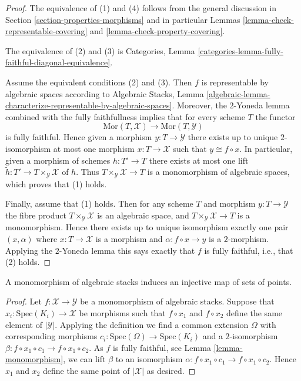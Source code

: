 \begin{proof}
The equivalence of (1) and (4) follows from the general discussion in
Section \ref{section-properties-morphisms}
and in particular
Lemmas \ref{lemma-check-representable-covering} and
\ref{lemma-check-property-covering}.

\medskip\noindent
The equivalence of (2) and (3) is
Categories, Lemma \ref{categories-lemma-fully-faithful-diagonal-equivalence}.

\medskip\noindent
Assume the equivalent conditions (2) and (3). Then $f$ is representable
by algebraic spaces according to
Algebraic Stacks,
Lemma \ref{algebraic-lemma-characterize-representable-by-algebraic-spaces}.
Moreover, the $2$-Yoneda lemma combined with the fully faithfullness
implies that for every scheme $T$ the functor
$$
\text{Mor}(T, \mathcal{X})
\longrightarrow
\text{Mor}(T, \mathcal{Y})
$$
is fully faithful. Hence given a morphism $y : T \to \mathcal{Y}$ there exists
up to unique $2$-isomorphism at most one morphism $x : T \to \mathcal{X}$
such that $y \cong f \circ x$. In particular, given a morphism of schemes
$h : T' \to T$ there exists at most one lift
$\tilde h : T' \to T \times_{\mathcal{Y}} \mathcal{X}$ of $h$.
Thus $T \times_{\mathcal{Y}} \mathcal{X} \to T$ is a monomorphism of
algebraic spaces, which proves that (1) holds.

\medskip\noindent
Finally, assume that (1) holds. Then for any scheme $T$ and morphism
$y : T \to \mathcal{Y}$ the fibre product $T \times_{\mathcal{Y}} \mathcal{X}$
is an algebraic space, and $T \times_{\mathcal{Y}} \mathcal{X} \to T$
is a monomorphism. Hence there exists up to unique isomorphism
exactly one pair $(x, \alpha)$ where $x : T \to \mathcal{X}$ is a morphism
and $\alpha : f \circ x \to y$ is a $2$-morphism. Applying
the $2$-Yoneda lemma this says exactly that $f$ is fully faithful, i.e.,
that (2) holds.
\end{proof}

\begin{lemma}
\label{lemma-monomorphism-injective-points}
A monomorphism of algebraic stacks induces an injective map of
sets of points.
\end{lemma}

\begin{proof}
Let $f : \mathcal{X} \to \mathcal{Y}$ be a monomorphism of algebraic stacks.
Suppose that $x_i : \text{Spec}(K_i) \to \mathcal{X}$ be morphisms such that
$f \circ x_1$ and $f \circ x_2$ define the same element of $|\mathcal{Y}|$.
Applying the definition we find a common extension $\Omega$ with corresponding
morphisms $c_i : \text{Spec}(\Omega) \to \text{Spec}(K_i)$ and a
$2$-isomorphism $\beta : f \circ x_1 \circ c_1 \to f \circ x_1 \circ c_2$.
As $f$ is fully faithful, see
Lemma \ref{lemma-monomorphism},
we can lift $\beta$ to an isomorphism
$\alpha : f \circ x_1 \circ c_1 \to f \circ x_1 \circ c_2$.
Hence $x_1$ and $x_2$ define the same point of $|\mathcal{X}|$
as desired.
\end{proof}









